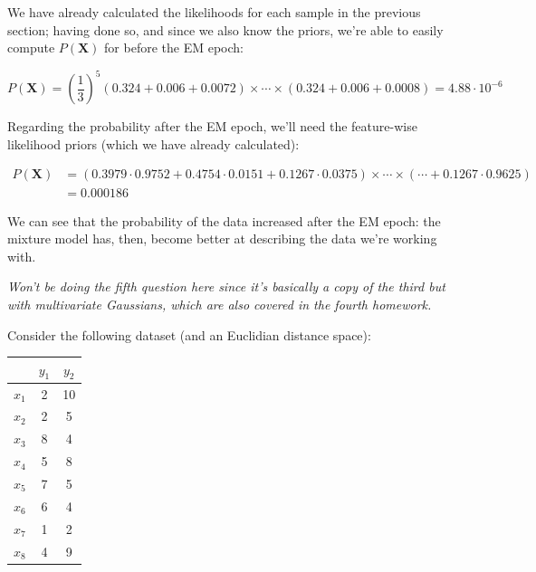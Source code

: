 \documentclass[12pt]{article}
\begin{document}
\begin{enumerate}[leftmargin=\labelsep]
  We have already calculated the likelihoods for each sample in the previous section;
  having done so, and since we also know the priors, we're able to easily
  compute $P(\mathbf{X})$ for before the EM epoch:

  \begin{equation*}
    P(\mathbf{X}) = \left(\frac{1}{3}\right)^5 (0.324 +  0.006 +  0.0072) \times \cdots \times (0.324 +  0.006 +  0.0008)
    = 4.88 \cdot 10^{-6}
  \end{equation*}

  Regarding the probability after the EM epoch, we'll need the feature-wise likelihood
  priors (which we have already calculated):

  \begin{equation*}
    \begin{aligned}
      P(\mathbf{X}) & = (0.3979 \cdot 0.9752 + 0.4754 \cdot 0.0151 + 0.1267 \cdot 0.0375) \times \cdots \times (\cdots + 0.1267 \cdot 0.9625) \\
                    & = 0.000186
    \end{aligned}
  \end{equation*}

  We can see that the probability of the data increased after the EM epoch: the mixture
  model has, then, become better at describing the data we're working with.

  \textit{Won't be doing the fifth question here since it's basically a copy of the
    third but with multivariate Gaussians, which are also covered in the fourth homework.}

  \begin{tcolorbox}[enhanced jigsaw,halign=center,colback=bg,boxrule=0pt,arc=1pt]

    \item Consider the following dataset (and an Euclidian distance space):

    \begin{table}[H]
      \centering
      \begin{tabular}{c|c|c}
              & $y_1$ & $y_2$ \\ \hline
        $x_1$ & 2     & 10    \\
        $x_2$ & 2     & 5     \\
        $x_3$ & 8     & 4     \\
        $x_4$ & 5     & 8     \\
        $x_5$ & 7     & 5     \\
        $x_6$ & 6     & 4     \\
        $x_7$ & 1     & 2     \\
        $x_8$ & 4     & 9     \\
      \end{tabular}
    \end{table}


\end{tcolorbox}
\end{enumerate}
\end{document}
